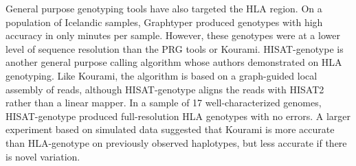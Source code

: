 General purpose genotyping tools have also targeted the HLA region.
On a population of Icelandic samples, Graphtyper \cite{eggertsson2017graphtyper} produced genotypes with high accuracy in only minutes per sample.
However, these genotypes were at a lower level of sequence resolution than the PRG tools or Kourami.
HISAT-genotype \cite{Kim_2019} is another general purpose calling algorithm whose authors demonstrated on HLA genotyping.
Like Kourami, the algorithm is based on a graph-guided local assembly of reads, although HISAT-genotype aligns the reads with HISAT2 rather than a linear mapper.
In a sample of 17 well-characterized genomes, HISAT-genotype produced full-resolution HLA genotypes with no errors.
A larger experiment based on simulated data suggested that Kourami is more accurate than HLA-genotype on previously observed haplotypes, but less accurate if there is novel variation.





